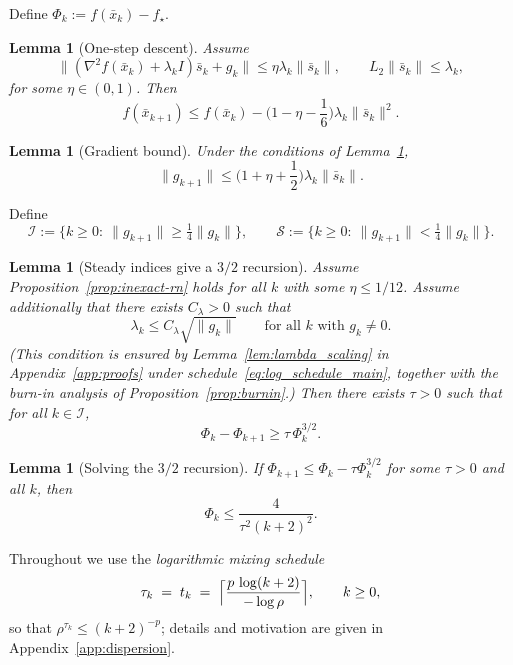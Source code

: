 \documentclass[11pt,a4paper]{article}
\newtheorem{lemma}[theorem]{Lemma}
\begin{document}
Define $\Phi_k:=f(\bar x_k)-f_\star$.

\begin{lemma}[One-step descent]\label{lem:descent}
Assume
\[
\|(\nabla^2 f(\bar x_k)+\lambda_k I)\bar s_k+g_k\|\le \eta\lambda_k\|\bar s_k\|,
\qquad
L_2\|\bar s_k\|\le \lambda_k,
\]
for some $\eta\in(0,1)$.
Then
\[
f(\bar x_{k+1})\le f(\bar x_k) - \Big(1-\eta-\frac{1}{6}\Big)\lambda_k\|\bar s_k\|^2.
\]
\end{lemma}

\begin{lemma}[Gradient bound]\label{lem:grad_bound}
Under the conditions of Lemma~\ref{lem:descent},
\[
\|g_{k+1}\|\le \Big(1+\eta+\frac{1}{2}\Big)\lambda_k\|\bar s_k\|.
\]
\end{lemma}

Define
\[
\mathcal I:=\{k\ge0:\ \|g_{k+1}\|\ge \tfrac14\|g_k\|\},
\qquad
\mathcal S:=\{k\ge0:\ \|g_{k+1}\|< \tfrac14\|g_k\|\}.
\]

\begin{lemma}[Steady indices give a $3/2$ recursion]\label{lem:steady}
Assume Proposition~\ref{prop:inexact-rn} holds for all $k$ with some $\eta\le 1/12$.
Assume additionally that there exists $C_\lambda>0$ such that
\[
\lambda_k\le C_\lambda\sqrt{\|g_k\|}\qquad\text{for all $k$ with $g_k\neq 0$}.
\]
(This condition is ensured by Lemma~\ref{lem:lambda_scaling}
in Appendix~\ref{app:proofs} under
schedule~\eqref{eq:log_schedule_main}, together with the burn-in
analysis of Proposition~\ref{prop:burnin}.)
Then there exists $\tau>0$ such that for all $k\in\mathcal I$,
\[
\Phi_k-\Phi_{k+1}\ge \tau\,\Phi_k^{3/2}.
\]
\end{lemma}

\begin{lemma}[Solving the $3/2$ recursion]\label{lem:solve32}
If $\Phi_{k+1}\le \Phi_k-\tau\Phi_k^{3/2}$ for some $\tau>0$ and all $k$, then
\[
\Phi_k\le \frac{4}{\tau^2(k+2)^2}.
\]
\end{lemma}

Throughout we use the \emph{logarithmic mixing schedule}
\begin{equation}\label{eq:log_schedule_main}
  \tau_k \;=\; t_k \;=\; \Bigl\lceil \frac{p\,\log(k+2)}{-\log\rho} \Bigr\rceil,
  \qquad k\ge 0,
\end{equation}
so that $\rho^{\tau_k}\le(k+2)^{-p}$; details and motivation are given in
Appendix~\ref{app:dispersion}.
\end{document}
